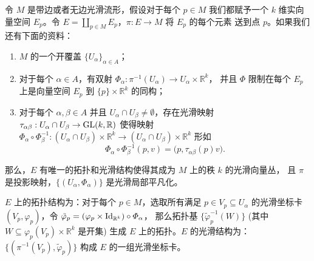\begin{lemma}[向量丛坐标卡引理]
  令 $M$ 是带边或者无边光滑流形，假设对于每个 $p\in M$ 我们都赋予一个 $k$ 维实向量空间
  $E_p$。令 $E=\coprod_{p\in M}E_p$，$\pi:E\to M$ 将 $E_p$ 的每个元素
  送到点 $p$。如果我们还有下面的资料：
  \begin{enumerate}
    \item $M$ 的一个开覆盖 $\{U_\alpha\}_{\alpha\in A}$；
    \item 对于每个 $\alpha\in A$，有双射 $\varPhi_\alpha:\pi^{-1}(U_\alpha)\to U_\alpha\times \mathbb{R}^k$，
    并且 $\varPhi$ 限制在每个 $E_p$ 上是向量空间 $E_p$ 到 $\{p\}\times \mathbb{R}^k$ 的同构；
    \item 对于每个 $\alpha,\beta\in A$ 并且 $U_\alpha\cap U_\beta\neq\emptyset$，存在光滑映射
    $\tau_{\alpha\beta}:U_\alpha\cap U_\beta\to \operatorname{GL}(k,\mathbb{R})$ 使得映射
    $\varPhi_\alpha\circ\varPhi_\beta^{-1}:(U_\alpha\cap U_\beta)\times \mathbb{R}^k\to (U_\alpha\cap U_\beta)\times \mathbb{R}^k$
    形如
    \[
      \varPhi_\alpha\circ\varPhi_\beta^{-1}(p,v)=\bigl(p,\tau_{\alpha\beta}(p)v\bigr).  
    \]
  \end{enumerate}
  那么，$E$ 有唯一的拓扑和光滑结构使得其成为 $M$ 上的秩 $k$ 的光滑向量丛，
  且 $\pi$ 是投影映射，$\{(U_\alpha,\varPhi_\alpha)\}$ 是光滑局部平凡化。
\end{lemma}

\begin{remark}
  $E$ 上的拓扑结构为：对于每个 $p\in M$，选取所有满足 $p\in V_p\subseteq U_\alpha$
  的光滑坐标卡 $(V_p,\varphi_p)$，令 $\tilde\varphi_p=(\varphi_p\times \operatorname{Id}_{\mathbb{R}^k})\circ\varPhi_\alpha$，
  那么拓扑基 $\{\tilde\varphi_p^{-1}(W)\}$ (其中 $W\subseteq \varphi_p(V_p)\times \mathbb{R}^k$ 是开集)
  生成 $E$ 上的拓扑。$E$ 的光滑结构为：$\{(\pi^{-1}(V_p),\tilde\varphi_p)\}$
  构成 $E$ 的一组光滑坐标卡。
\end{remark} 

